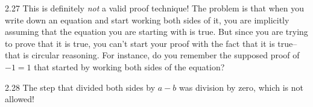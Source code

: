 \begin{RequAnswer}{2.27}
This is definitely {\em not} a valid proof technique! The problem is that when you write down an equation and start
working both sides of it, you are implicitly assuming that the equation you are starting with is true. But since you
are trying to prove that it is true, you can't start your proof with the fact that it is true--that is circular reasoning.
For instance, do you remember the supposed proof of  $-1=1$ that started by working both sides of the equation?
\end{RequAnswer}
\begin{RequAnswer}{2.28}
The step that divided both sides by $a-b$ was division by zero,
which is not allowed!
\end{RequAnswer}
